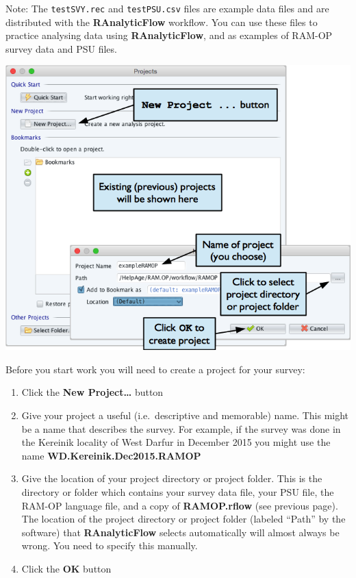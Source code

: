 \documentclass[12pt,a4paper]{book}
\theoremstyle{definition}
\theoremstyle{definition}
\theoremstyle{definition}
\theoremstyle{remark}
\begin{document}
Note: The \texttt{testSVY.rec} and \texttt{testPSU.csv} files are
example data files and are distributed with the \textbf{RAnalyticFlow}
workflow. You can use these files to practice analysing data using
\textbf{RAnalyticFlow}, and as examples of RAM-OP survey data and PSU
files.

\begin{center}\includegraphics[width=9.76in]{figures/openProjectRAF} \end{center}

Before you start work you will need to create a project for your survey:

\begin{enumerate}
\def\labelenumi{\arabic{enumi}.}
\item
  Click the \textbf{New Project\ldots{}} button
\item
  Give your project a useful (i.e.~descriptive and memorable) name. This
  might be a name that describes the survey. For example, if the survey
  was done in the Kereinik locality of West Darfur in December 2015 you
  might use the name \textbf{WD.Kereinik.Dec2015.RAMOP}
\item
  Give the location of your project directory or project folder. This is
  the directory or folder which contains your survey data file, your PSU
  file, the RAM-OP language file, and a copy of \textbf{RAMOP.rflow}
  (see previous page). The location of the project directory or project
  folder (labeled ``Path'' by the software) that \textbf{RAnalyticFlow}
  selects automatically will almost always be wrong. You need to specify
  this manually.
\item
  Click the \textbf{OK} button
\end{enumerate}
\end{document}
